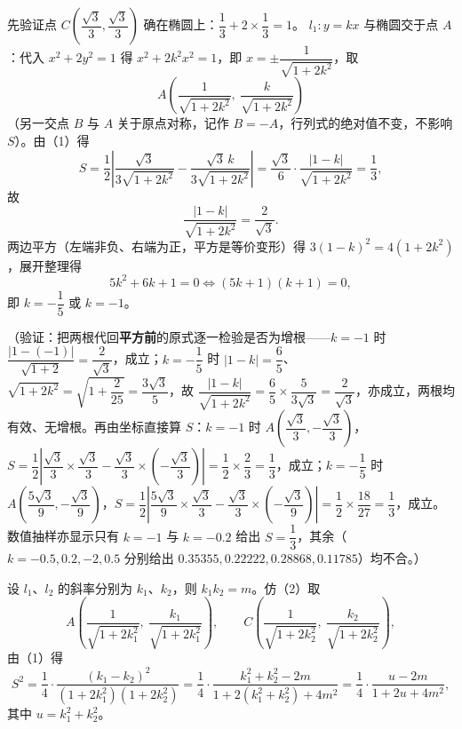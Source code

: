 \begin{answer}

先验证点 \(C\left(\dfrac{\sqrt3}{3},\dfrac{\sqrt3}{3}\right)\) 确在椭圆上：\(\dfrac{1}{3}+2\times\dfrac{1}{3}=1\)。
\(l_{1}:y=kx\) 与椭圆交于点 \(A\)：代入 \(x^{2}+2y^{2}=1\) 得 \(x^{2}+2k^{2}x^{2}=1\)，即 \(x=\pm\dfrac{1}{\sqrt{1+2k^{2}}}\)，取
\nopagebreak[4]
\[
A\left(\frac{1}{\sqrt{1+2k^{2}}},\ \frac{k}{\sqrt{1+2k^{2}}}\right)
\]
（另一交点 \(B\) 与 \(A\) 关于原点对称，记作 \(B=-A\)，行列式的绝对值不变，不影响 \(S\)）。由（1）得
\nopagebreak[4]
\[
S=\frac{1}{2}\left|\frac{\sqrt3}{3\sqrt{1+2k^{2}}}-\frac{\sqrt3\,k}{3\sqrt{1+2k^{2}}}\right|=\frac{\sqrt3}{6}\cdot\frac{|1-k|}{\sqrt{1+2k^{2}}}=\frac{1}{3},
\]
故
\nopagebreak[4]
\[
\frac{|1-k|}{\sqrt{1+2k^{2}}}=\frac{2}{\sqrt3}.
\]
两边平方（左端非负、右端为正，平方是等价变形）得 \(3(1-k)^{2}=4(1+2k^{2})\)，展开整理得
\nopagebreak[4]
\[
5k^{2}+6k+1=0\iff(5k+1)(k+1)=0,
\]
即 \(k=-\dfrac{1}{5}\) 或 \(k=-1\)。

（验证：把两根代回\textbf{平方前}的原式逐一检验是否为增根——\(k=-1\) 时 \(\dfrac{|1-(-1)|}{\sqrt{1+2}}=\dfrac{2}{\sqrt3}\)，成立；\(k=-\dfrac{1}{5}\) 时 \(|1-k|=\dfrac{6}{5}\)、\(\sqrt{1+2k^{2}}=\sqrt{1+\dfrac{2}{25}}=\dfrac{3\sqrt3}{5}\)，故 \(\dfrac{|1-k|}{\sqrt{1+2k^{2}}}=\dfrac{6}{5}\times\dfrac{5}{3\sqrt3}=\dfrac{2}{\sqrt3}\)，亦成立，两根均有效、无增根。再由坐标直接算 \(S\)：\(k=-1\) 时 \(A\left(\dfrac{\sqrt3}{3},-\dfrac{\sqrt3}{3}\right)\)，\(S=\dfrac{1}{2}\left|\dfrac{\sqrt3}{3}\times\dfrac{\sqrt3}{3}-\dfrac{\sqrt3}{3}\times\left(-\dfrac{\sqrt3}{3}\right)\right|=\dfrac{1}{2}\times\dfrac{2}{3}=\dfrac{1}{3}\)，成立；\(k=-\dfrac{1}{5}\) 时 \(A\left(\dfrac{5\sqrt3}{9},-\dfrac{\sqrt3}{9}\right)\)，\(S=\dfrac{1}{2}\left|\dfrac{5\sqrt3}{9}\times\dfrac{\sqrt3}{3}-\dfrac{\sqrt3}{3}\times\left(-\dfrac{\sqrt3}{9}\right)\right|=\dfrac{1}{2}\times\dfrac{18}{27}=\dfrac{1}{3}\)，成立。数值抽样亦显示只有 \(k=-1\) 与 \(k=-0.2\) 给出 \(S=\dfrac{1}{3}\)，其余（\(k=-0.5,0.2,-2,0.5\) 分别给出 \(0.35355,0.22222,0.28868,0.11785\)）均不合。）


设 \(l_{1}\)、\(l_{2}\) 的斜率分别为 \(k_{1}\)、\(k_{2}\)，则 \(k_{1}k_{2}=m\)。仿（2）取
\nopagebreak[4]
\[
A\left(\frac{1}{\sqrt{1+2k_{1}^{2}}},\ \frac{k_{1}}{\sqrt{1+2k_{1}^{2}}}\right),\qquad C\left(\frac{1}{\sqrt{1+2k_{2}^{2}}},\ \frac{k_{2}}{\sqrt{1+2k_{2}^{2}}}\right),
\]
由（1）得
\nopagebreak[4]
\[
S^{2}=\frac{1}{4}\cdot\frac{(k_{1}-k_{2})^{2}}{(1+2k_{1}^{2})(1+2k_{2}^{2})}=\frac{1}{4}\cdot\frac{k_{1}^{2}+k_{2}^{2}-2m}{1+2(k_{1}^{2}+k_{2}^{2})+4m^{2}}=\frac{1}{4}\cdot\frac{u-2m}{1+2u+4m^{2}},
\]
其中 \(u=k_{1}^{2}+k_{2}^{2}\)。


\end{answer}
